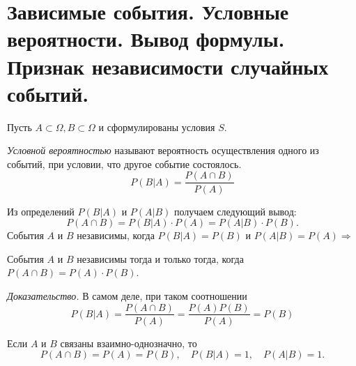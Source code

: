 \documentclass[polytech/stats/exam-2023/stats-exam-2023.tex]{subfiles}
\begin{document}
\section{Зависимые события. Условные вероятности. Вывод формулы. Признак независимости случайных событий.}
    \begin{definition}
        Пусть $A \subset \Omega, B \subset \Omega$ и сформулированы условия $S$.

        \textit{Условной вероятностью} называют вероятность осуществления одного из событий, при условии, что
        другое событие состоялось.
        \begin{equation*}
            P(B|A) = \frac{P(A \cap B)}{P(A)}
        \end{equation*}
    \end{definition}

    Из определений $P(B|A)$ и $P(A|B)$ получаем следующий вывод:
    \begin{equation*}
        P(A \cap B) = P(B|A) \cdot P(A) = P(A|B) \cdot P(B).
    \end{equation*}
    События $A$ и $B$ независимы, когда $P(B|A) = P(B)$ и $P(A|B) = P(A) \Rightarrow$
    \begin{theorem}
        События $A$ и $B$ независимы тогда и только тогда, когда $P(A \cap B) = P(A) \cdot P(B)$.

        \textit{Доказательство.}
        \vspace{0.5cm}
        В самом деле, при таком соотношении
        \begin{equation*}
            P(B|A) = \frac{P(A \cap B)}{P(A)} = \frac{P(A)P(B)}{P(A)} = P(B)
        \end{equation*}
    \end{theorem}
    Если $A$ и $B$ связаны взаимно-однозначно, то 
    \begin{equation*}
        P(A \cap B) = P(A) = P(B), \quad P(B|A) = 1, \quad P(A|B) = 1.
    \end{equation*}
    \newpage
\end{document}
